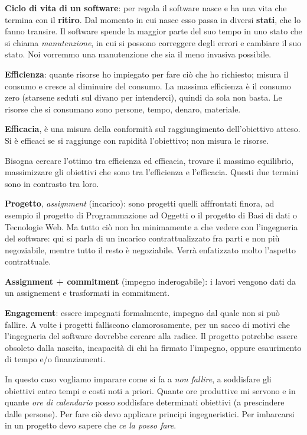 \textbf{Ciclo di vita di un software}: per regola il software nasce e ha una vita che termina con il \textbf{ritiro}. Dal momento in cui nasce esso passa in diversi \textbf{stati}, che lo fanno transire. Il software spende la maggior parte del suo tempo in uno stato che si chiama \textit{manutenzione}, in cui si possono correggere degli errori e cambiare il suo stato. Noi vorremmo una manutenzione che sia il meno invasiva possibile.

\textbf{Efficienza}: quante risorse ho impiegato per fare ciò che ho richiesto; misura il consumo e cresce al diminuire del consumo. La massima efficienza è il consumo zero (starsene seduti sul divano per intenderci), quindi da sola non basta. Le risorse che si consumano sono persone, tempo, denaro, materiale.

\textbf{Efficacia}, è una misura della conformità sul raggiungimento dell'obiettivo atteso. Si è efficaci se si raggiunge con rapidità l'obiettivo; non misura le risorse.

Bisogna cercare l'ottimo tra efficienza ed efficacia, trovare il massimo equilibrio, massimizzare gli obiettivi che sono tra l'efficienza e l'efficacia. Questi due termini sono in contrasto tra loro.

\textbf{Progetto}, \textit{assignment} (incarico): sono progetti quelli afffrontati finora, ad esempio il progetto di Programmazione ad Oggetti o il progetto di Basi di dati o Tecnologie Web. Ma tutto ciò non ha minimamente a che vedere con l'ingegneria del software: qui si parla di un incarico contrattualizzato fra parti e non più negoziabile, mentre tutto il resto è negoziabile. Verrà enfatizzato molto l'aspetto contrattuale. 

\textbf{Assignment + commitment} (impegno inderogabile): i lavori vengono dati da un assignement e trasformati in commitment.

\textbf{Engagement}: essere impegnati formalmente, impegno dal quale non si può fallire. A volte i progetti falliscono clamorosamente, per un sacco di motivi che l'ingegneria del software dovrebbe cercare alla radice. Il progetto potrebbe essere obsoleto dalla nascita, incapacità di chi ha firmato l'impegno, oppure esaurimento di tempo e/o finanziamenti. 

In questo caso vogliamo imparare come si fa a \textit{non fallire}, a soddisfare gli obiettivi entro tempi e costi noti a priori. Quante ore produttive mi servono e in quante \textit{ore di calendario} posso soddisfare determinati obiettivi (a prescindere dalle persone). Per fare ciò devo applicare principi ingegneristici. Per imbarcarsi in un progetto devo sapere che \textit{ce la posso fare}.

